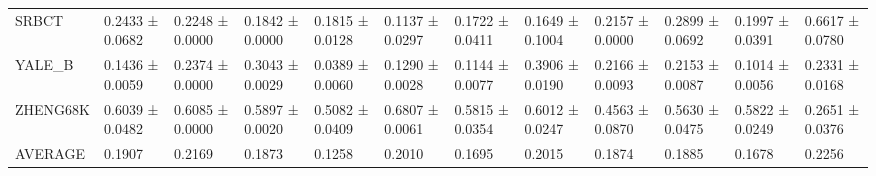 \begin{tabular}{llllllllllll}
SRBCT & 0.2433 ± 0.0682 & 0.2248 ± 0.0000 & 0.1842 ± 0.0000 & 0.1815 ± 0.0128 & 0.1137 ± 0.0297 & 0.1722 ± 0.0411 & 0.1649 ± 0.1004 & 0.2157 ± 0.0000 & 0.2899 ± 0.0692 & 0.1997 ± 0.0391 & 0.6617 ± 0.0780 \\
YALE_B & 0.1436 ± 0.0059 & 0.2374 ± 0.0000 & 0.3043 ± 0.0029 & 0.0389 ± 0.0060 & 0.1290 ± 0.0028 & 0.1144 ± 0.0077 & 0.3906 ± 0.0190 & 0.2166 ± 0.0093 & 0.2153 ± 0.0087 & 0.1014 ± 0.0056 & 0.2331 ± 0.0168 \\
ZHENG68K & 0.6039 ± 0.0482 & 0.6085 ± 0.0000 & 0.5897 ± 0.0020 & 0.5082 ± 0.0409 & 0.6807 ± 0.0061 & 0.5815 ± 0.0354 & 0.6012 ± 0.0247 & 0.4563 ± 0.0870 & 0.5630 ± 0.0475 & 0.5822 ± 0.0249 & 0.2651 ± 0.0376 \\
AVERAGE & 0.1907 & 0.2169 & 0.1873 & 0.1258 & 0.2010 & 0.1695 & 0.2015 & 0.1874 & 0.1885 & 0.1678 & 0.2256 \\
\bottomrule
\end{tabular}
